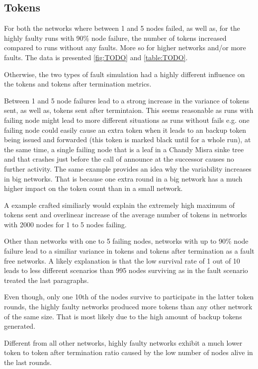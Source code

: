\subsection{Tokens}
For both the networks where between 1 and 5 nodes failed, as well as, for the highly faulty runs with 90\% node failure, the number of tokens increased compared to runs without any faults.
More so for higher networks and/or more faults. The data is presented \cref{fig:TODO} and \cref{table:TODO}. %

Otherwise, the two types of fault simulation had a highly different influence on the tokens and tokens after termination metrics.

Between 1 and 5 node failures lead to a strong increase in the variance of tokens sent, as well as, tokens sent after termintaion.
This seems reasonable as runs with failing node might lead to more different situations as runs without fails e.g. one failing node could easily cause an extra token when it leads to an backup token being issued and forwarded (this token is marked black until for a whole run), at the same time, a single failing node that is a leaf in a Chandy Misra sinke tree and that crashes just before the call of announce at the successor  causes no further activity.
The same example provides an idea why the variability increases in big networks. 
That is because one extra round in a big network has a much higher impact on the token count than in a small network.

A example crafted similiarly would explain the extremely high maximum of tokens sent and overlinear increase of the average number of tokens in networks with 2000 nodes for 1 to 5 nodes failing.

Other than networks with one to 5 failing nodes, networks with up to 90\% node failure lead to a similiar variance in tokens and tokens after termination as a fault free networks.
A likely explanation is that the low survival rate of 1 out of 10 leads to less different scenarios than 995 nodes surviving as in the fault scenario treated the last paragraphs.

Even though, only one 10th of the nodes survive to participate in the latter token rounds, the highly faulty networks produced more tokens than any other network of the same size.
That is most likely due to the high amount of backup tokens generated.

Different from all other networks, highly faulty networks exhibit a much lower token to token after termination ratio caused by the low number of nodes alive in the last rounds.
    

